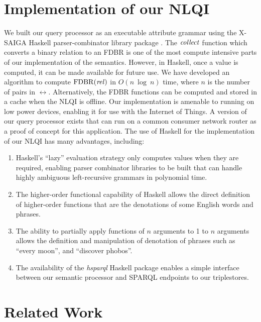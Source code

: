 \documentclass[../main.tex]{subfiles}
\begin{document}
\begin{refsection}
\section{Implementation of our NLQI}
\label{webist2019conf:implementation}
We built our query processor as an executable attribute grammar using the X-SAIGA Haskell parser-combinator library package \cite{frosthafiz2008}.
The $\operatorname{\mathit{collect}}$ function which converts a binary relation to an FDBR is one of the most
compute intensive parts of our implementation of the semantics. However, in Haskell, once a value is
computed, it can be made available for future use. We have developed an algorithm to compute
$\operatorname{FDBR}({\operatorname{\mathit{rel}}})$ in $O(n\ \operatorname{log}\ n)$ time, where $n$ is the number of pairs in $\rel$.
Alternatively, the FDBR functions can be computed and stored in a cache when the NLQI is offline.
Our implementation is amenable to running on low power devices, enabling it for use with the Internet of Things. A version of our query processor exists that can run on a common consumer network router as a proof of concept for this application.
The use of Haskell for the implementation of our NLQI has many advantages, including:

\begin{enumerate}
	\item Haskell's ``lazy'' evaluation strategy only computes values when they are required, enabling parser combinator
	libraries to be built that can handle highly ambiguous left-recursive grammars in polynomial time.
	\item The higher-order functional capability of Haskell allows the direct definition of higher-order
	functions that are the denotations of some English words and phrases.
	\item The ability to partially apply functions of $n$ arguments to 1 to $n$ arguments allows the
	definition and manipulation of denotation of phrases such as ``every moon'', and ``discover
	phobos''.
	\item The availability of the \textit{hsparql} \cite{hsparql} Haskell package enables a simple interface between our semantic processor and SPARQL endpoints to our triplestores.
\end{enumerate}

\section{Related Work}
\label{webist2019conf:relatedwork}


\end{refsection}
\end{document}
